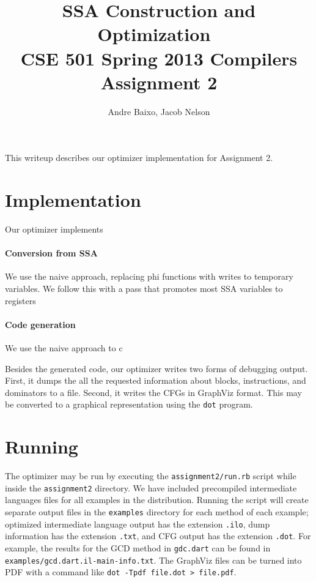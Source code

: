 \documentclass[10pt,twocolumn]{article}
\begin{document}
\title{SSA Construction and Optimization\ \\
  \small CSE 501 Spring 2013 Compilers Assignment 2}
\author{Andre Baixo, Jacob Nelson}
\maketitle

This writeup describes our optimizer implementation for Assignment 2.

\section{Implementation}

Our optimizer implements 

\paragraph{Conversion from SSA} We use the naive approach, 
replacing phi functions with writes to temporary variables. We follow
this with a pass that promotes most SSA variables to registers 

\paragraph{Code generation} We use the naive approach to c




Besides the generated code, our optimizer writes two forms of
debugging output. First, it dumps the all the requested information
about blocks, instructions, and dominators to a file. Second, it
writes the CFGs in GraphViz format. This may be converted to a
graphical representation using the \texttt{dot} program.

\section{Running}

The optimizer may be run by executing the \texttt{assignment2/run.rb}
script while inside the \texttt{assignment2} directory. We have
included precompiled intermediate languages files for all examples in
the distribution. Running the script will create separate output files
in the \texttt{examples} directory for each method of each example;
optimized intermediate language output has the extension
\texttt{.ilo}, dump information has the extension \texttt{.txt}, and
CFG output has the extension \texttt{.dot}. For example, the results
for the GCD method in \texttt{gdc.dart} can be found in
\texttt{examples/gcd.dart.il-main-info.txt}. The GraphViz files can be
turned into PDF with a command like \texttt{dot -Tpdf file.dot >
  file.pdf}.
\end{document}
